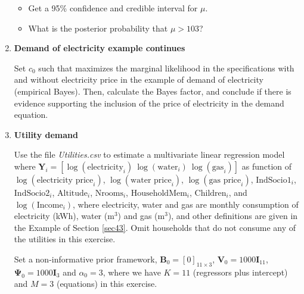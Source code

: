 \begin{enumerate}
\begin{itemize}
	\item Get a 95\% confidence and credible interval for $\mu$.
	\item What is the posterior probability that $\mu > 103$?  
\end{itemize} 


\item \textbf{Demand of electricity example continues}

Set $c_0$ such that maximizes the marginal likelihood in the specifications with and without electricity price in the example of demand of electricity (empirical Bayes). Then, calculate the Bayes factor, and conclude if there is evidence supporting the inclusion of the price of electricity in the demand equation.

\item \textbf{Utility demand}

Use the file \textit{Utilities.csv} to estimate a multivariate linear regression model where $\mathbf{Y}_i=\left[\log(\text{electricity}_i) \ \log(\text{water}_i) \ \log(\text{gas}_i)\right]$ as function of $\log(\text{electricity price}_i)$, $\log(\text{water price}_i)$, $\log(\text{gas price}_i)$, $\text{IndSocio1}_i$, $\text{IndSocio2}_i$, $\text{Altitude}_i$, $\text{Nrooms}_i$, $\text{HouseholdMem}_i$, $\text{Children}_i$, and $\log(\text{Income}_i)$, where electricity, water and gas are monthly consumption of electricity (kWh), water (m$^3$) and gas (m$^3$), and other definitions are given in the Example of Section \ref{sec43}. Omit households that do not consume any of the utilities in this exercise.  

Set a non-informative prior framework, $\mathbf{B}_0=\left[0\right]_{11\times 3}$, $\mathbf{V}_0=1000 \mathbf{I}_{11}$, $\mathbf{\Psi}_0=1000 \mathbf{I}_{3}$ and $\alpha_0=3$, where we have $K=11$ (regressors plus intercept) and $M=3$ (equations) in this exercise.


\end{enumerate}
